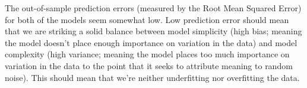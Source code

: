 \documentclass{article}
\begin{document}
The out-of-sample prediction errors (measured by the Root Mean Squared Error) for both of the models seem somewhat low. Low prediction error should mean that we are striking a solid balance between model simplicity (high bias; meaning the model doesn't place enough importance on variation in the data) and model complexity (high variance; meaning the model places too much importance on variation in the data to the point that it seeks to attribute meaning to random noise). This should mean that we're neither underfitting nor overfitting the data.
\end{document}

